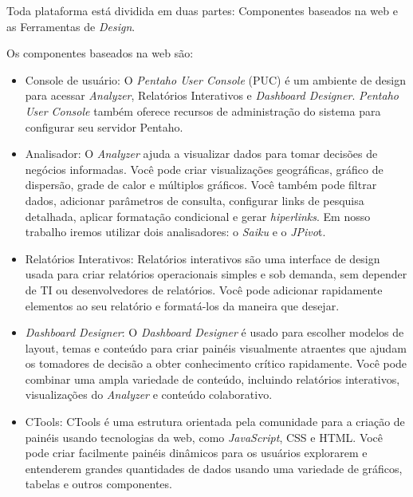 Toda plataforma est\'{a} dividida em duas partes: Componentes baseados na web e as Ferramentas de \textit{Design}.

Os componentes baseados na web s\~{a}o:

\begin{itemize}
    \item Console de usu\'{a}rio: O \textit{Pentaho User Console} (PUC) \'{e} um ambiente de design para acessar \textit{Analyzer}, Relat\'orios Interativos e \textit{Dashboard Designer}. \textit{Pentaho User Console} tamb\'{e}m oferece recursos de administra\c{c}\~{a}o do sistema para configurar seu servidor Pentaho.
    
    \item Analisador: O \textit{Analyzer} ajuda a visualizar dados para tomar decis\~{o}es de neg\'ocios informadas. Você pode criar visualiza\c{c}\~{o}es geogr\'{a}ficas, gr\'{a}fico de dispers\~{a}o, grade de calor e múltiplos gr\'{a}ficos. Você tamb\'{e}m pode filtrar dados, adicionar parâmetros de consulta, configurar links de pesquisa detalhada, aplicar formata\c{c}\~{a}o condicional e gerar \textit{hiperlinks}. Em nosso trabalho iremos utilizar dois analisadores: o \textit{Saiku} e o \textit{JPivo}t.
    
    \item Relat\'orios Interativos: Relat\'orios interativos s\~{a}o uma interface de design usada para criar relat\'orios operacionais simples e sob demanda, sem depender de TI ou desenvolvedores de relat\'orios. Você pode adicionar rapidamente elementos ao seu relat\'orio e format\'{a}-los da maneira que desejar.
    
    \item \textit{Dashboard Designer}: O \textit{Dashboard Designer} \'{e} usado para escolher modelos de layout, temas e conteúdo para criar pain\'{e}is visualmente atraentes que ajudam os tomadores de decis\~{a}o a obter conhecimento crítico rapidamente. Você pode combinar uma ampla variedade de conteúdo, incluindo relat\'orios interativos, visualiza\c{c}\~{o}es do \textit{Analyzer} e conteúdo colaborativo.
    
    \item CTools: CTools \'{e} uma estrutura orientada pela comunidade para a cria\c{c}\~{a}o de pain\'{e}is usando tecnologias da web, como \textit{JavaScript}, CSS e HTML. Você pode criar facilmente pain\'{e}is dinâmicos para os usu\'{a}rios explorarem e entenderem grandes quantidades de dados usando uma variedade de gr\'{a}ficos, tabelas e outros componentes.
    

\end{itemize}
